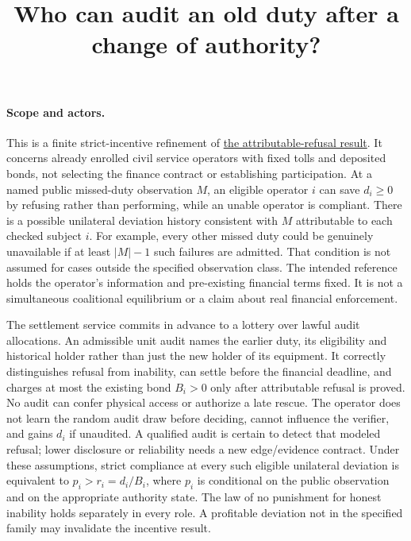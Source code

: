 \documentclass[11pt]{article}
\title{Who can audit an old duty after a change of authority?}
\author{}\date{}
\begin{document}
\maketitle

\paragraph{Scope and actors.}
This is a finite strict-incentive refinement of
\href{https://github.com/eternal-november/eos-research-programmes/pull/663}
{the attributable-refusal result}. It concerns already enrolled
civil service operators with fixed tolls and deposited bonds,
not selecting the finance contract or establishing participation.
At a named public missed-duty observation \(M\), an eligible operator
\(i\) can save \(d_i\ge0\) by refusing rather than performing, while
an unable operator is compliant. There is a possible unilateral
deviation history consistent with \(M\) attributable to each checked
subject \(i\). For example, every other missed duty could be genuinely
unavailable if at least \(|M|-1\) such failures are admitted. That
condition is not assumed for cases outside the specified observation
class. The intended reference holds the operator's information and
pre-existing financial terms fixed. It is not a simultaneous
coalitional equilibrium or a claim about real financial enforcement.

The settlement service commits in advance to a lottery over lawful
audit allocations. An admissible unit audit names the earlier duty,
its eligibility and historical holder rather than just the new holder
of its equipment. It correctly distinguishes refusal from inability,
can settle before the financial deadline, and charges at most the
existing bond \(B_i>0\) only after attributable refusal is proved.
No audit can confer physical access or authorize a late rescue.
The operator does not learn the random audit draw before deciding,
cannot influence the verifier, and gains \(d_i\) if unaudited. A
qualified audit is certain to detect that modeled refusal; lower
disclosure or reliability needs a new edge/evidence contract. Under
these assumptions, strict compliance at every such eligible
unilateral deviation is equivalent to \(p_i>r_i=d_i/B_i\), where
\(p_i\) is conditional on the public observation and on the appropriate
authority state. The law of no punishment for honest inability
holds separately in every role. A profitable deviation not in the
specified family may invalidate the incentive result.
\end{document}
